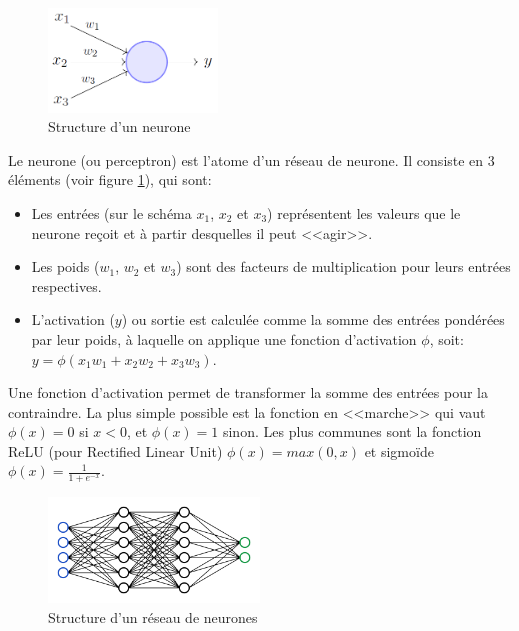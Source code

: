 \documentclass[openany, 11pt]{memoir}
\begin{document}
\begin{figure}[ht]
	\centering
	\includegraphics[width=0.4\textwidth]{images/neurone.png}
	\caption{Structure d'un neurone}
	\label{neurone}
\end{figure}

\bigskip
Le neurone (ou perceptron) est l'atome d'un réseau de neurone. Il consiste en 3 éléments (voir figure \ref{neurone}), qui sont:

\begin{itemize}
	\item Les entrées (sur le schéma $x_1$, $x_2$ et $x_3$) représentent les valeurs que le neurone reçoit et à partir desquelles il peut <<agir>>.
	\item Les poids ($w_1$, $w_2$ et $w_3$) sont des facteurs de multiplication pour leurs entrées respectives.
	\item L'activation ($y$) ou sortie est calculée comme la somme des entrées pondérées par leur poids, à laquelle on applique une fonction d'activation $\phi$, soit: $y = \phi(x_1 w_1 + x_2 w_2 + x_3 w_3)$.
\end{itemize}

Une fonction d'activation permet de transformer la somme des entrées pour la contraindre. La plus simple possible est la fonction en <<marche>> qui vaut $\phi(x) = 0$ si $x < 0$, et $\phi(x) = 1$ sinon. Les plus communes sont la fonction ReLU (pour Rectified Linear Unit) $\phi(x) = max(0, x)$ et sigmoïde $\phi(x) = \frac{1}{1 + e^{-x}}$.

\begin{figure}[ht]
	\centering
	\includegraphics[width=0.5\textwidth]{images/reseau.png}
	\caption{Structure d'un réseau de neurones}
	\label{reseau}
\end{figure}
\end{document}
